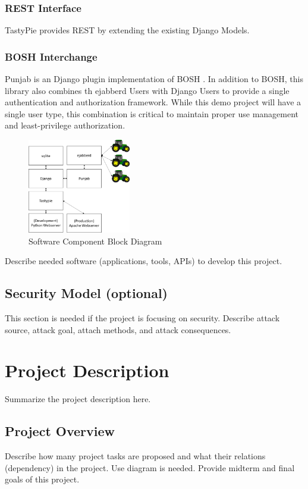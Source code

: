 \documentclass[conference,12pt]{IEEEtran}
\begin{document}
\subsubsection{REST Interface}
TastyPie provides REST \autocite{_toastdriven/django-tastypie_2014} by extending
the existing Django Models.
\subsubsection{BOSH Interchange}
Punjab is an Django plugin implementation of BOSH
\autocite{_twonds/punjab_2014}.  In addition to BOSH, this library also combines
th ejabberd Users with Django Users to provide a single authentication and
authorization framework. While this demo project will have a single user type,
this combination is critical to maintain proper use management and
least-privilege authorization.

\begin{figure}
\centering
\includegraphics[width=0.4\textwidth]{SoftwareComponentBlockDiagram.pdf}
\caption{Software Component Block Diagram}
\label{fig:softwarecomponents}
\end{figure}

Describe needed software (applications, tools, APIs) to develop this project.
\subsection{Security Model (optional)}
This section is needed if the project is focusing on security. Describe attack source, attack goal, attach methods, and attack consequences. 
\section{Project Description}
Summarize the project description here.
\subsection{Project Overview}
Describe how many project tasks are proposed and what their relations (dependency) in the project. Use diagram is needed. Provide midterm and final goals of this project.
\end{document}
